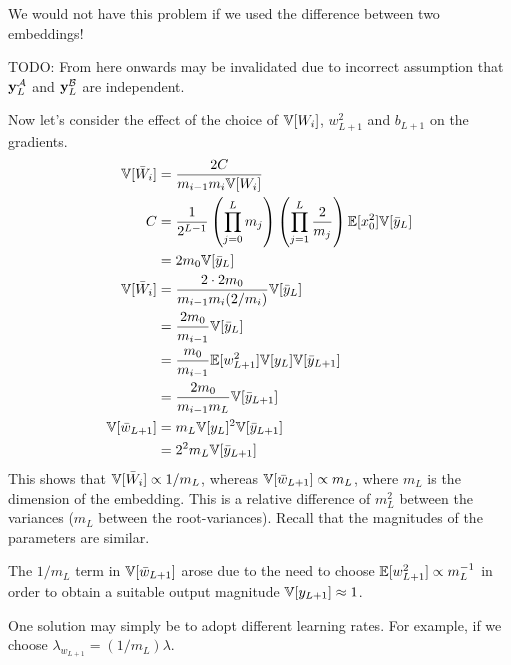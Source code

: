 We would not have this problem if we used the difference between two embeddings!

TODO: From here onwards may be invalidated due to incorrect assumption that $\boldsymbol{\mathbf{y}}_{L}^{\mathcal{A}}$ and $\boldsymbol{\mathbf{y}}_{L}^{\mathcal{B}}$ are independent.

Now let's consider the effect of the choice of $\mathbb{V}[W_{i}]$, $w_{L+1}^2$ and $b_{L+1}$ on the gradients.
\begin{align}
\mathbb{V}[\bar{W}_{i}]
& = \frac{2 C}{m_{i-1} m_{i} \mathbb{V}[W_{i}]} \\
C & = \frac{1}{2^{L-1}} \left(\prod_{j=0}^{L} m_{j} \right) \left(\prod_{j=1}^{L} \frac{2}{m_{j}} \right)
  \mathbb{E}[x_{0}^2] \mathbb{V}[\bar{y}_{L}] \\
& = 2 m_{0} \mathbb{V}[\bar{y}_{L}] \\
\mathbb{V}[\bar{W}_{i}]
& = \frac{2 \cdot 2 m_{0}}{m_{i-1} m_{i} (2 / m_{i})} \mathbb{V}[\bar{y}_{L}] \\
& = \frac{2 m_{0}}{m_{i-1}} \mathbb{V}[\bar{y}_{L}] \\
& = \frac{m_{0}}{m_{i-1}} \mathbb{E}[w_{L+1}^2] \mathbb{V}[y_{L}] \mathbb{V}[\bar{y}_{L+1}] \\
& = \frac{2 m_{0}}{m_{i-1} m_{L}} \mathbb{V}[\bar{y}_{L+1}] \\
\mathbb{V}[\bar{w}_{L+1}]
& = m_{L} \mathbb{V}[y_{L}]^{2} \mathbb{V}[\bar{y}_{L+1}] \\
& = 2^2 m_{L} \mathbb{V}[\bar{y}_{L+1}]
\end{align}
This shows that $\mathbb{V}[\bar{W}_{i}] \propto 1/m_{L}$, whereas $\mathbb{V}[\bar{w}_{L+1}] \propto m_{L}$, where $m_{L}$ is the dimension of the embedding.
This is a relative difference of $m_{L}^2$ between the variances ($m_{L}$ between the root-variances).
Recall that the magnitudes of the parameters are similar.

The $1/m_{L}$ term in $\mathbb{V}[\bar{w}_{L+1}]$ arose due to the need to choose $\mathbb{E}[w_{L+1}^2] \propto m_{L}^{-1}$ in order to obtain a suitable output magnitude $\mathbb{V}[y_{L+1}] \approx 1$.


One solution may simply be to adopt different learning rates.
For example, if we choose $\lambda_{w_{L+1}} = (1 / m_{L}) \lambda$.

